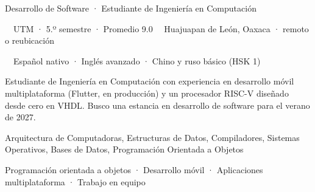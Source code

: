 \documentclass[10pt,letterpaper]{article}
\begin{document}
\cvbackground

\begin{cvheader}
  \cvname
  \vspace{7pt}
  {\color{white}\large Desarrollo de Software · Estudiante de Ingeniería en Computación}\par
  \vspace{5pt}
  {\small\color{side}\faUniversity\ \ UTM · 5.º semestre · Promedio 9.0\qquad
   \faMapMarker*\ \ Huajuapan de León, Oaxaca · remoto o reubicación}\par
  \vspace{3pt}
  {\small\color{side}\faLanguage\ \ Español nativo · Inglés avanzado · Chino y ruso básico (HSK 1)}
\end{cvheader}

\begin{cvside}
  {\small Estudiante de Ingeniería en Computación con experiencia en desarrollo móvil
  multiplataforma (Flutter, en producción) y un procesador RISC-V diseñado desde cero
  en VHDL. Busco una estancia en desarrollo de software para el verano de 2027.}\par

      {Arquitectura de Computadoras, Estructuras de Datos, Compiladores, Sistemas Operativos, Bases de Datos, Programación Orientada a Objetos}

  \par
  \vspace{4pt}
  \par
  \vspace{4pt}
  \par
  \vspace{4pt}
  {\footnotesize\color{white}Programación orientada a objetos · Desarrollo móvil · Aplicaciones multiplataforma · Trabajo en equipo}\par

\end{cvside}
\end{document}
